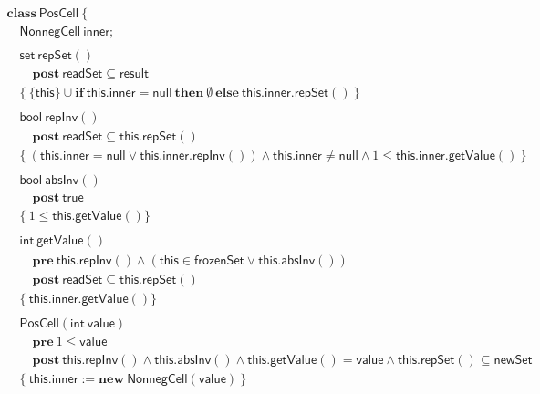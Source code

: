 \documentclass{article}
\begin{document}
$$\begin{array}{l}
\mathbf{class}\ \mathsf{PosCell}\ \{\\
\quad \mathsf{NonnegCell}\ \mathsf{inner};\\
\\
\quad \mathsf{set}\ \mathsf{repSet}()\\
\quad\quad \mathbf{post}\ \mathsf{readSet} \subseteq \mathsf{result}\\
\quad \{\ \{\mathsf{this}\} \cup \mathbf{if}\ \mathsf{this}.\mathsf{inner} = \mathsf{null}\ \mathbf{then}\ \emptyset\ \mathbf{else}\ \mathsf{this}.\mathsf{inner}.\mathsf{repSet}()\ \}\\
\\
\quad \mathsf{bool}\ \mathsf{repInv}()\\
\quad\quad \mathbf{post}\ \mathsf{readSet} \subseteq \mathsf{this}.\mathsf{repSet}()\\
\quad \{\ (\mathsf{this}.\mathsf{inner} = \mathsf{null} \lor \mathsf{this}.\mathsf{inner}.\mathsf{repInv}()) \land \mathsf{this}.\mathsf{inner} \neq \mathsf{null} \land 1 \le \mathsf{this}.\mathsf{inner}.\mathsf{getValue}()\ \}\\
\\
\quad \mathsf{bool}\ \mathsf{absInv}()\\
\quad\quad \mathbf{post}\ \mathsf{true}\\
\quad \{\ 1 \le \mathsf{this}.\mathsf{getValue}() \}\\
\\
\quad \mathsf{int}\ \mathsf{getValue}()\\
\quad\quad \mathbf{pre}\ \mathsf{this}.\mathsf{repInv}() \land (\mathsf{this} \in \mathsf{frozenSet} \lor \mathsf{this}.\mathsf{absInv}())\\
\quad\quad \mathbf{post}\ \mathsf{readSet} \subseteq \mathsf{this}.\mathsf{repSet}()\\
\quad \{\ \mathsf{this}.\mathsf{inner}.\mathsf{getValue}() \}\\
\\
\quad \mathsf{PosCell}(\mathsf{int}\ \mathsf{value})\\
\quad\quad \mathbf{pre}\ 1 \le \mathsf{value}\\
\quad\quad \mathbf{post}\ \mathsf{this}.\mathsf{repInv}() \land \mathsf{this}.\mathsf{absInv}() \land \mathsf{this}.\mathsf{getValue}() = \mathsf{value} \land \mathsf{this}.\mathsf{repSet}() \subseteq \mathsf{newSet}\\
\quad \{\ \mathsf{this}.\mathsf{inner} := \mathbf{new}\ \mathsf{NonnegCell}(\mathsf{value})\ \}\\

\end{array}$$
\end{document}
